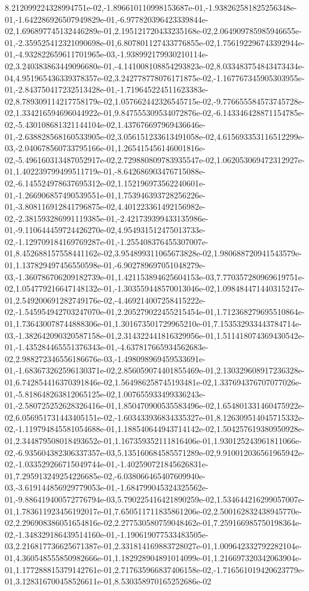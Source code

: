 8.212099224328994751e-02,-1.896610110998153687e-01,-1.938262581825256348e-01,-1.642286926507949829e-01,-6.977820396423339844e-02,1.696897745132446289e-01,2.195121720433235168e-02,2.064909785985946655e-01,-2.359525412321090698e-01,6.807801127433776855e-02,1.756192296743392944e-01,-4.932822659611701965e-03,-1.938992179930210114e-02,3.240383863449096680e-01,-4.141008108854293823e-02,8.033483754843473434e-04,4.951965436339378357e-02,3.242778778076171875e-02,-1.167767345905303955e-01,-2.843750417232513428e-01,-1.719645224511623383e-02,8.789309114217758179e-02,1.057662442326545715e-02,-9.776655584573745728e-02,1.334216594696044922e-01,9.847555309534072876e-02,-6.143346428871154785e-02,-5.430108681321144104e-02,1.437676697969436646e-01,-2.638828568160533905e-02,3.056151233613491058e-02,4.615693353116512299e-03,-2.040678560733795166e-01,1.265415456146001816e-02,-5.496160313487052917e-02,2.729880809783935547e-02,1.062053069472312927e-01,1.402239799499511719e-01,-8.642686903476715088e-02,-6.145524978637695312e-02,1.152196973562240601e-01,-1.266906857490539551e-01,1.753946393728256226e-01,-3.808116912841796875e-02,4.401223361492156982e-02,-2.381593286991119385e-01,-2.421739399433135986e-01,-9.110644459724426270e-02,4.954931512475013733e-02,-1.129709184169769287e-01,-1.255408376455307007e-01,8.452688157558441162e-02,3.954899311065673828e-02,1.980688720941543579e-01,1.137829497456550598e-01,-6.902789697051048279e-03,-1.360786706209182739e-01,1.421153894625604153e-03,7.770357280969619751e-02,1.054779216647148132e-01,-1.303559448570013046e-02,1.098484471440315247e-01,2.549200691282749176e-02,-4.469214007258415222e-02,-1.545954942703247070e-01,2.205279022455215454e-01,1.712368279695510864e-01,1.736430078744888306e-01,1.301673501729965210e-01,7.153532933443784714e-03,-1.382642090320587158e-01,2.314322441816329956e-01,1.511418074369430542e-01,-1.435284465551376343e-01,-4.637817665934562683e-02,2.988272346556186676e-03,-1.498098969459533691e-01,-1.683673262596130371e-02,2.856059074401855469e-01,2.130329608917236328e-01,6.742854416370391846e-02,1.564986258745193481e-02,1.337694376707077026e-01,-5.818648263812065125e-02,1.007655933499336243e-01,-2.580725252628326416e-01,1.850470900535583496e-02,1.654801331460475922e-02,6.056951731443405151e-02,-1.603433936834335327e-01,8.126309514045715332e-02,-1.119794845581054688e-01,1.188540644943714142e-02,1.504257619380950928e-01,2.344879508018493652e-01,1.167359352111816406e-01,1.930125243961811066e-02,-6.935604382306337357e-03,5.135160684585571289e-02,9.910012036561965942e-02,-1.033529266715049744e-01,-1.402590721845626831e-01,7.295913249254226685e-02,-6.038066465407609940e-03,-3.619144856929779053e-01,-1.684799045324325562e-01,-9.886419400572776794e-03,5.790225416421890259e-02,1.534644216299057007e-01,1.783611923456192017e-01,7.650511711835861206e-02,2.500162832438945770e-02,2.296908386051654816e-02,2.277530580759048462e-01,7.259166985750198364e-02,-1.348329186439514160e-01,-1.190619077533483505e-03,2.216817736625671387e-01,2.331814169883728027e-01,1.009642332792282104e-01,4.360548555850982666e-01,1.182928904891014099e-01,1.216697320342063904e-01,1.177288815379142761e-01,2.717635966837406158e-02,-1.716561019420623779e-01,3.128316700458526611e-01,8.530358970165252686e-02

